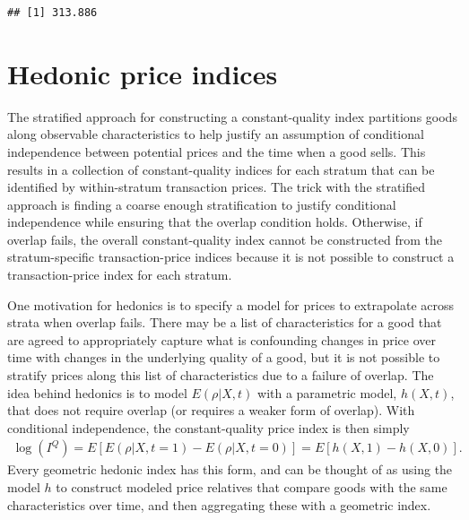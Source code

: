 \documentclass[
]{article}
\begin{document}
\begin{verbatim}
## [1] 313.886
\end{verbatim}

\hypertarget{hedonic-price-indices}{%
\section{Hedonic price indices}\label{hedonic-price-indices}}

The stratified approach for constructing a constant-quality index partitions goods along observable characteristics to help justify an assumption of conditional independence between potential prices and the time when a good sells. This results in a collection of constant-quality indices for each stratum that can be identified by within-stratum transaction prices. The trick with the stratified approach is finding a coarse enough stratification to justify conditional independence while ensuring that the overlap condition holds. Otherwise, if overlap fails, the overall constant-quality index cannot be constructed from the stratum-specific transaction-price indices because it is not possible to construct a transaction-price index for each stratum.

One motivation for hedonics is to specify a model for prices to extrapolate across strata when overlap fails. There may be a list of characteristics for a good that are agreed to appropriately capture what is confounding changes in price over time with changes in the underlying quality of a good, but it is not possible to stratify prices along this list of characteristics due to a failure of overlap. The idea behind hedonics is to model \(E(\rho | X, t)\) with a parametric model, \(h(X, t)\), that does not require overlap (or requires a weaker form of overlap). With conditional independence, the constant-quality price index is then simply
\begin{align*}
\log(I^{Q}) = E[E(\rho | X, t = 1) - E(\rho | X, t = 0)] = E[h(X, 1) - h(X, 0)].
\end{align*}
Every geometric hedonic index has this form, and can be thought of as using the model \(h\) to construct modeled price relatives that compare goods with the same characteristics over time, and then aggregating these with a geometric index.
\end{document}
